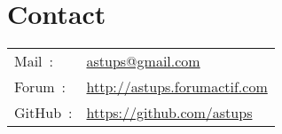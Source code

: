 \section{Contact}

\begin{tabular}{ll}
Mail~: & \url{astups@gmail.com} \\
Forum~: & \url{http://astups.forumactif.com} \\
GitHub~: & \url{https://github.com/astups} \\
\end{tabular}
